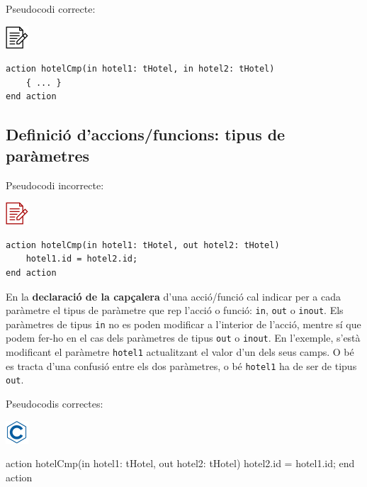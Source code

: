 \documentclass[
]{book}
\newenvironment{Shaded}{\begin{snugshade}}{\end{snugshade}}
\newcommand{\NormalTok}[1]{#1}
\begin{document}
Pseudocodi correcte:

\includegraphics{./img/alg.png}

\begin{verbatim}
action hotelCmp(in hotel1: tHotel, in hotel2: tHotel)
    { ... }
end action
\end{verbatim}

\hypertarget{definiciuxf3-daccionsfuncions-tipus-de-paruxe0metres}{%
\subsection{Definició d'accions/funcions: tipus de paràmetres}\label{definiciuxf3-daccionsfuncions-tipus-de-paruxe0metres}}

Pseudocodi incorrecte:

\includegraphics{./img/alg_err.png}

\begin{verbatim}
action hotelCmp(in hotel1: tHotel, out hotel2: tHotel)
    hotel1.id = hotel2.id;
end action
\end{verbatim}

En la \textbf{declaració de la capçalera} d'una acció/funció cal indicar per a cada paràmetre el tipus de paràmetre que rep l'acció o funció: \texttt{in}, \texttt{out} o \texttt{inout}. Els paràmetres de tipus \texttt{in} no es poden modificar a l'interior de l'acció, mentre sí que podem fer-ho en el cas dels paràmetres de tipus \texttt{out} o \texttt{inout}. En l'exemple, s'està modificant el paràmetre \texttt{hotel1} actualitzant el valor d'un dels seus camps. O bé es tracta d'una confusió entre els dos paràmetres, o bé \texttt{hotel1} ha de ser de tipus \texttt{out}.

Pseudocodis correctes:

\includegraphics{./img/c.png}

\begin{Shaded}
\begin{Highlighting}[]
\NormalTok{action hotelCmp(in hotel1: tHotel, out hotel2: tHotel)}
\NormalTok{    hotel2.id = hotel1.id;}
\NormalTok{end action}
\end{Highlighting}
\end{Shaded}
\end{document}
